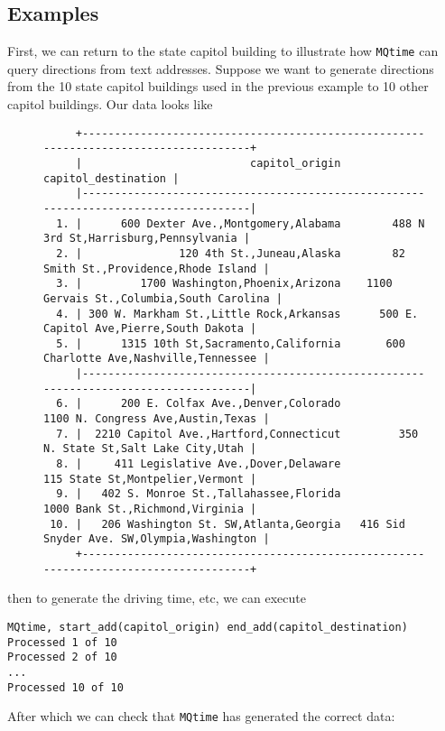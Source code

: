 \documentclass[12pt]{article}
\begin{document}
\subsection{Examples}
First, we can return to the state capitol building to illustrate how \verb|MQtime| can query directions from text addresses. Suppose we want to generate directions from the 10 state capitol buildings used in the previous example to 10 other capitol buildings. Our data looks like
\begin{figure}[htbp]
{\footnotesize
\begin{verbatim}
     +-------------------------------------------------------------------------------------+
     |                          capitol_origin                         capitol_destination |
     |-------------------------------------------------------------------------------------|
  1. |      600 Dexter Ave.,Montgomery,Alabama        488 N 3rd St,Harrisburg,Pennsylvania |
  2. |               120 4th St.,Juneau,Alaska        82 Smith St.,Providence,Rhode Island |
  3. |         1700 Washington,Phoenix,Arizona    1100 Gervais St.,Columbia,South Carolina |
  4. | 300 W. Markham St.,Little Rock,Arkansas      500 E. Capitol Ave,Pierre,South Dakota |
  5. |      1315 10th St,Sacramento,California       600 Charlotte Ave,Nashville,Tennessee |
     |-------------------------------------------------------------------------------------|
  6. |      200 E. Colfax Ave.,Denver,Colorado           1100 N. Congress Ave,Austin,Texas |
  7. |  2210 Capitol Ave.,Hartford,Connecticut         350 N. State St,Salt Lake City,Utah |
  8. |     411 Legislative Ave.,Dover,Delaware             115 State St,Montpelier,Vermont |
  9. |   402 S. Monroe St.,Tallahassee,Florida             1000 Bank St.,Richmond,Virginia |
 10. |   206 Washington St. SW,Atlanta,Georgia   416 Sid Snyder Ave. SW,Olympia,Washington |
     +-------------------------------------------------------------------------------------+
\end{verbatim}
}
\end{figure}
then to generate the driving time, etc, we can execute
\begin{center}
\begin{verbatim}
MQtime, start_add(capitol_origin) end_add(capitol_destination)
Processed 1 of 10
Processed 2 of 10
...
Processed 10 of 10
\end{verbatim}
\end{center}
After which we can check that \verb|MQtime| has generated the correct data:
\end{document}
